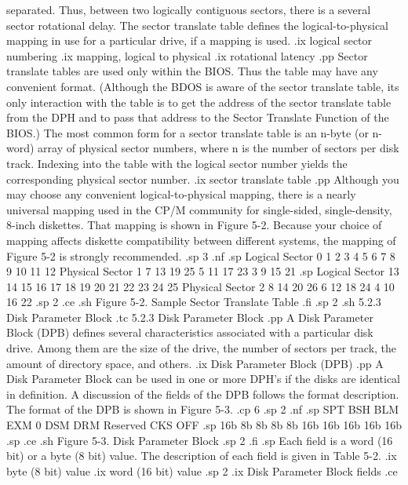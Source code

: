 separated.  Thus, between two logically contiguous sectors, there is a 
several sector rotational delay.  The sector translate table defines
the logical-to-physical mapping in use for a particular drive, if a
mapping is used.
.ix logical sector numbering
.ix mapping, logical to physical
.ix rotational latency
.pp
Sector translate tables are used only within the BIOS.  Thus the table
may have any convenient format.  (Although the BDOS is aware of the
sector translate table, its only interaction with the table is to get the
address of the sector translate table from the DPH and to pass that address
to the Sector Translate Function of the BIOS.)  The most common form for a
sector translate table is an n-byte (or n-word) array of physical sector 
numbers, where n is the number of sectors per disk track.  Indexing into 
the table with the logical sector number yields the corresponding physical 
sector number.
.ix sector translate table
.pp
Although you may choose any convenient logical-to-physical mapping, there is
a nearly universal mapping used in the CP/M community for single-sided, 
single-density, 8-inch diskettes.  That mapping is shown in Figure 5-2.  
Because your choice of mapping affects diskette compatibility between 
different systems, the mapping of Figure 5-2 is strongly recommended.
.sp 3
.nf
.sp
     Logical  Sector   0  1  2  3  4  5  6  7  8  9 10 11 12
     Physical Sector   1  7 13 19 25  5 11 17 23  3  9 15 21
.sp
     Logical  Sector  13 14 15 16 17 18 19 20 21 22 23 24 25
     Physical Sector   2  8 14 20 26  6 12 18 24  4 10 16 22
.sp 2
.ce
.sh
Figure 5-2.  Sample Sector Translate Table
.fi
.sp 2
.sh
5.2.3  Disk Parameter Block
.tc         5.2.3  Disk Parameter Block
.pp
A Disk Parameter Block (DPB) defines several characteristics associated
with a particular disk drive.  Among them are the size of the drive, the
number of sectors per track, the amount of directory space, and others.
.ix Disk Parameter Block (DPB)
.pp
A Disk Parameter Block can be used in one or more DPH's if the disks are 
identical in definition.  A discussion of the fields of the DPB follows the 
format description.  The format of the DPB is shown in Figure 5-3.
.cp 6
.sp 2
.nf
.sp
  SPT   BSH   BLM   EXM   0   DSM   DRM   Reserved    CKS   OFF
.sp
  16b   8b     8b    8b   8b  16b   16b      16b      16b   16b
.sp
.ce
.sh
Figure 5-3.  Disk Parameter Block
.sp 2
.fi
.sp
Each field is a word (16 bit) or a byte (8 bit) value.  The description of 
each field is given in Table 5-2.
.ix byte (8 bit) value
.ix word (16 bit) value
.sp 2
.ix Disk Parameter Block fields
.ce 
